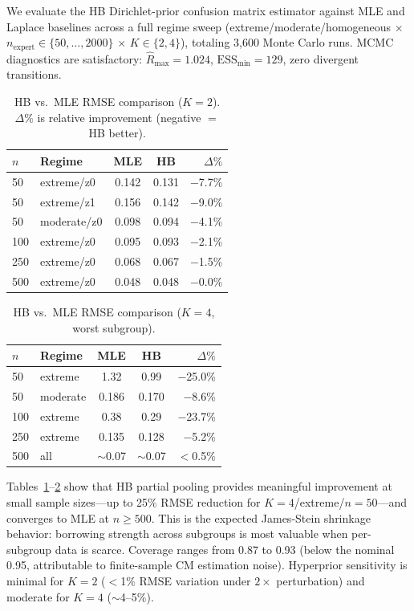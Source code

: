 \documentclass[11pt,twocolumn]{article}
\begin{document}
We evaluate the HB Dirichlet-prior confusion matrix estimator against MLE and Laplace baselines across a full regime sweep (extreme/moderate/homogeneous $\times$ $n_{\text{expert}} \in \{50, \ldots, 2000\}$ $\times$ $K \in \{2, 4\}$), totaling 3,600 Monte Carlo runs. MCMC diagnostics are satisfactory: $\hat{R}_{\max} = 1.024$, $\text{ESS}_{\min} = 129$, zero divergent transitions.

\begin{table}[t]
\centering
\small
\caption{HB vs.\ MLE RMSE comparison ($K{=}2$). $\Delta\%$ is relative improvement (negative $=$ HB better).}
\label{tab:hb_k2}
\begin{tabular}{@{}llccr@{}}
\toprule
$n$ & Regime & MLE & HB & $\Delta\%$ \\
\midrule
50 & extreme/z0 & 0.142 & 0.131 & $-$7.7\% \\
50 & extreme/z1 & 0.156 & 0.142 & $-$9.0\% \\
50 & moderate/z0 & 0.098 & 0.094 & $-$4.1\% \\
100 & extreme/z0 & 0.095 & 0.093 & $-$2.1\% \\
250 & extreme/z0 & 0.068 & 0.067 & $-$1.5\% \\
500 & extreme/z0 & 0.048 & 0.048 & $-$0.0\% \\
\bottomrule
\end{tabular}
\end{table}

\begin{table}[t]
\centering
\small
\caption{HB vs.\ MLE RMSE comparison ($K{=}4$, worst subgroup).}
\label{tab:hb_k4}
\begin{tabular}{@{}llccr@{}}
\toprule
$n$ & Regime & MLE & HB & $\Delta\%$ \\
\midrule
50 & extreme & 1.32 & 0.99 & $-$25.0\% \\
50 & moderate & 0.186 & 0.170 & $-$8.6\% \\
100 & extreme & 0.38 & 0.29 & $-$23.7\% \\
250 & extreme & 0.135 & 0.128 & $-$5.2\% \\
500 & all & $\sim$0.07 & $\sim$0.07 & $<$0.5\% \\
\bottomrule
\end{tabular}
\end{table}

Tables~\ref{tab:hb_k2}--\ref{tab:hb_k4} show that HB partial pooling provides meaningful improvement at small sample sizes---up to 25\% RMSE reduction for $K{=}4$/extreme/$n{=}50$---and converges to MLE at $n \geq 500$. This is the expected James-Stein shrinkage behavior: borrowing strength across subgroups is most valuable when per-subgroup data is scarce. Coverage ranges from 0.87 to 0.93 (below the nominal 0.95, attributable to finite-sample CM estimation noise). Hyperprior sensitivity is minimal for $K{=}2$ ($<$1\% RMSE variation under $2\times$ perturbation) and moderate for $K{=}4$ ($\sim$4--5\%).
\end{document}
